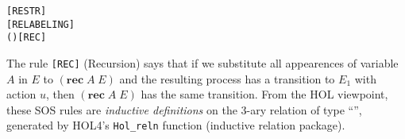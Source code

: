 \begin{alltt}
   \HOLSymConst{\ensuremath{\nu}}   \HOLTokenTransBegin{}\HOLTokenTransEnd \HOLSymConst{\ensuremath{\nu}}  \hfill\texttt{[RESTR]}
\HOLTokenTurnstile{}  \HOLTokenTransBegin{}\HOLTokenTransEnd {} \HOLSymConst{\HOLTokenImp{}}    \HOLTokenTransBegin{}  \HOLTokenTransEnd {}  \hfill\texttt{[RELABELING]}
\HOLTokenTurnstile{}   (  )  \HOLTokenTransBegin{}\HOLTokenTransEnd {} \HOLSymConst{\HOLTokenImp{}}    \HOLTokenTransBegin{}\HOLTokenTransEnd {}\hfill\texttt{[REC]}
\end{alltt}

The rule \texttt{[REC]} (Recursion)
 says that if we substitute all appearences of variable $A$ in $E$ to
$(\mathbf{rec}\; A\; E)$ and the resulting process has a transition to $E_1$
with action $u$, then $(\mathbf{rec}\; A\; E)$ has the same
transition. From the HOL  viewpoint, these
SOS rules are \emph{inductive 
  definitions} on the 3-ary relation  of type ``'', generated by HOL4's 
\texttt{Hol_reln} function (inductive relation package).

